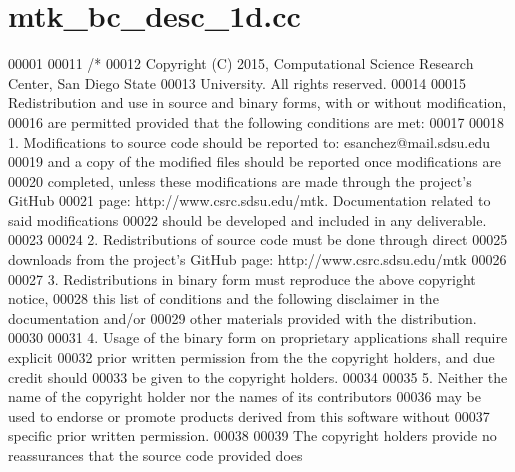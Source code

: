 \hypertarget{mtk__bc__desc__1d_8cc_source}{\section{mtk\+\_\+bc\+\_\+desc\+\_\+1d.\+cc}
\label{mtk__bc__desc__1d_8cc_source}
}

\begin{DoxyCode}
00001 
00011 \textcolor{comment}{/*}
00012 \textcolor{comment}{Copyright (C) 2015, Computational Science Research Center, San Diego State}
00013 \textcolor{comment}{University. All rights reserved.}
00014 \textcolor{comment}{}
00015 \textcolor{comment}{Redistribution and use in source and binary forms, with or without modification,}
00016 \textcolor{comment}{are permitted provided that the following conditions are met:}
00017 \textcolor{comment}{}
00018 \textcolor{comment}{1. Modifications to source code should be reported to: esanchez@mail.sdsu.edu}
00019 \textcolor{comment}{and a copy of the modified files should be reported once modifications are}
00020 \textcolor{comment}{completed, unless these modifications are made through the project's GitHub}
00021 \textcolor{comment}{page: http://www.csrc.sdsu.edu/mtk. Documentation related to said modifications}
00022 \textcolor{comment}{should be developed and included in any deliverable.}
00023 \textcolor{comment}{}
00024 \textcolor{comment}{2. Redistributions of source code must be done through direct}
00025 \textcolor{comment}{downloads from the project's GitHub page: http://www.csrc.sdsu.edu/mtk}
00026 \textcolor{comment}{}
00027 \textcolor{comment}{3. Redistributions in binary form must reproduce the above copyright notice,}
00028 \textcolor{comment}{this list of conditions and the following disclaimer in the documentation and/or}
00029 \textcolor{comment}{other materials provided with the distribution.}
00030 \textcolor{comment}{}
00031 \textcolor{comment}{4. Usage of the binary form on proprietary applications shall require explicit}
00032 \textcolor{comment}{prior written permission from the the copyright holders, and due credit should}
00033 \textcolor{comment}{be given to the copyright holders.}
00034 \textcolor{comment}{}
00035 \textcolor{comment}{5. Neither the name of the copyright holder nor the names of its contributors}
00036 \textcolor{comment}{may be used to endorse or promote products derived from this software without}
00037 \textcolor{comment}{specific prior written permission.}
00038 \textcolor{comment}{}
00039 \textcolor{comment}{The copyright holders provide no reassurances that the source code provided does}

\end{DoxyCode}
